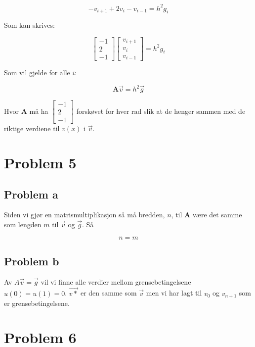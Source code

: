 \documentclass[english,notitlepage]{revtex4-1}  %
\begin{document}
$$-v_{i+1} + 2v_{i} - v_{i-1} = h^2g_i$$

Som kan skrives:

$$\begin{bmatrix}
-1 \\ 2 \\ -1
\end{bmatrix}\begin{bmatrix}
v_{i+1} \\ v_i \\ v_{i-1}
\end{bmatrix} = h^2 g_i $$

Som vil gjelde for alle $i$:

$$\textbf{A} \vec{v} = h^2 \vec{g} $$

Hvor \textbf{A} må ha $\begin{bmatrix}
-1 \\ 2 \\ -1
\end{bmatrix}$ forskøvet for hver rad slik at de henger sammen med de riktige verdiene til $v(x)$ i $\vec{v}$.


\section*{Problem 5}


\subsection*{Problem a}

Siden vi gjør en matrismultiplikasjon så må bredden, $n$, til $\textbf{A}$ være det samme som lengden $m$ til $\overrightarrow{v}$ og $\overrightarrow{g}$. Så

$$n = m$$

\subsection*{Problem b}
Av $A\vec{v}=\vec{g}$ vil vi finne alle verdier mellom grensebetingelsene $u(0)=u(1)=0$. $\vec{v*}$ er den samme som $\vec{v}$ men vi har lagt til $v_0$ og $v_{n+1}$ som er grensebetingelsene.

\section*{Problem 6}
\end{document}
